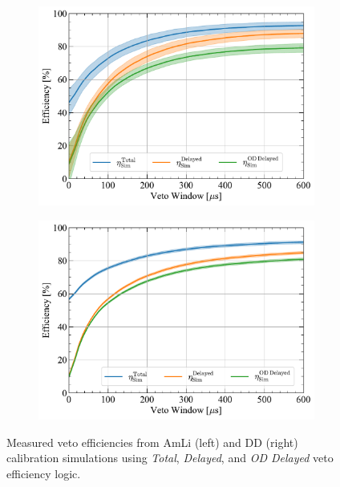 \begin{figure}[ht!]
    \centering
    \begin{subfigure}[b]{0.49\textwidth}
        \centering
        \includegraphics[width=\textwidth]{figures/VetoEfficiency/AmLiEfficiencies_Sim.pdf}
        \caption{}
        \label{fig:VetoEff/AmLiSimEfficiencies}
    \end{subfigure}
    \hfill
    \begin{subfigure}[b]{0.49\textwidth}
        \centering
        \includegraphics[width=\textwidth]{figures/VetoEfficiency/DDEfficiencies_Sim.pdf}
        \caption{}
        \label{fig:VetoEff/DDSimEfficiencies}
    \end{subfigure}
    \caption[Measured veto efficiencies from AmLi and DD calibration simulations.]{Measured veto efficiencies from AmLi (left) and DD (right) calibration simulations using \textit{Total}, \textit{Delayed}, and \textit{OD Delayed} veto efficiency logic.}
    \label{fig:VetoEff/CalibrationSimEfficiencies}
\end{figure}
